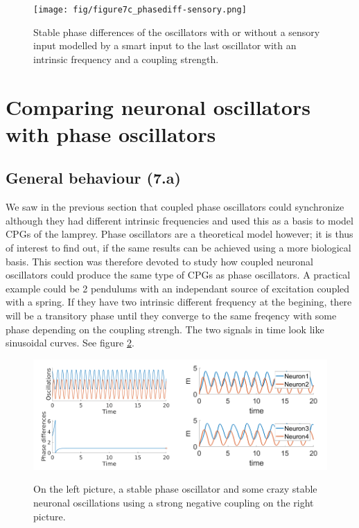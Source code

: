 \documentclass[a4paper]{scrartcl}
\begin{document}
\begin{figure}[b]
	\centering
	\texttt{[image: fig/figure7c\_phasediff-sensory.png]}
	\caption{Stable phase differences of the oscillators with or without a sensory input modelled by a smart input to the last oscillator with an intrinsic frequency and a coupling strength.}
	\label{fig:sensoryphase}
\end{figure}

\FloatBarrier

\section{Comparing neuronal oscillators with phase oscillators}
\subsection{General behaviour (7.a)}

We saw  in the previous section that coupled phase oscillators could synchronize although they had different intrinsic frequencies and used this as a basis to model CPGs of the lamprey. Phase oscillators are a theoretical model however; it is thus of interest to find out, if the same results can be achieved using a more biological basis. This section was therefore devoted to study how coupled neuronal oscillators could produce the same type of CPGs as phase oscillators. A practical example could be 2 pendulums with an independant source of excitation coupled with a spring. If they have two intrinsic different frequency at the begining, there will be a transitory phase until they converge to the same freqency with some phase depending on the coupling strengh. The two signals in time look like sinusoidal curves. See figure \ref{2phase}.

\begin{figure}[!h]
	\centering
	\includegraphics[width=0.5\textwidth]{fig/2phase.png}\includegraphics[width=0.5\textwidth]{fig/neuron1}
	\caption{On the left picture, a stable phase oscillator and some crazy stable neuronal oscillations using a strong negative coupling on the right picture.}\label{2phase}
\end{figure}
\end{document}
